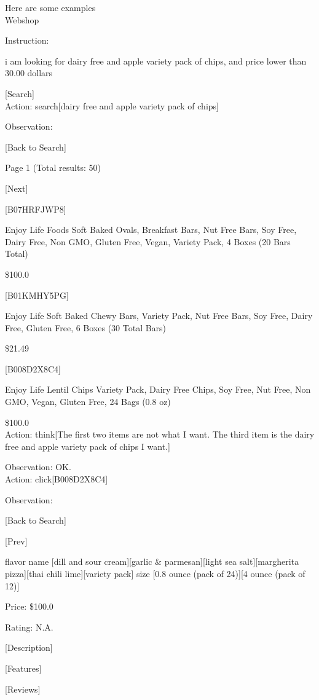 \documentclass{article} \usepackage{iclr2024_conference,times}
\begin{document}
Here are some examples
\\

Webshop

Instruction:

i am looking for dairy free and apple variety pack of chips, and price lower than 30.00 dollars

[Search]
\\

Action: search[dairy free and apple variety pack of chips]

Observation:

[Back to Search]

Page 1 (Total results: 50)

[Next]

[B07HRFJWP8]

Enjoy Life Foods Soft Baked Ovals, Breakfast Bars, Nut Free Bars, Soy Free, Dairy Free, Non GMO, Gluten Free, Vegan, Variety Pack, 4 Boxes (20 Bars Total)

\$100.0

[B01KMHY5PG]

Enjoy Life Soft Baked Chewy Bars, Variety Pack, Nut Free Bars, Soy Free, Dairy Free, Gluten Free, 6 Boxes (30 Total Bars)

\$21.49

[B008D2X8C4]

Enjoy Life Lentil Chips Variety Pack, Dairy Free Chips, Soy Free, Nut Free, Non GMO, Vegan, Gluten Free, 24 Bags (0.8 oz)

\$100.0
\\

Action: think[The first two items are not what I want. The third item is the dairy free and apple variety pack of chips I want.]

Observation: OK.
\\

Action: click[B008D2X8C4]

Observation:

[Back to Search]

[Prev]

flavor name [dill and sour cream][garlic \& parmesan][light sea salt][margherita pizza][thai chili lime][variety pack]
size [0.8 ounce (pack of 24)][4 ounce (pack of 12)]

Price: \$100.0

Rating: N.A.

[Description]

[Features]

[Reviews]
\end{document}
